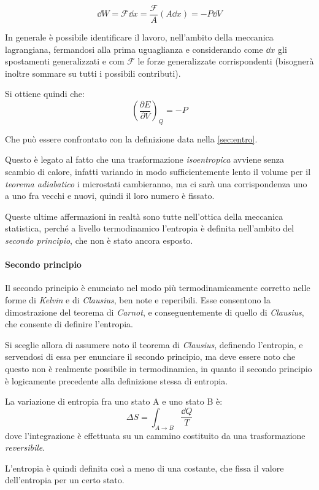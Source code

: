 \begin{equation*}
\dd W = \mathcal{F} \dd x = \frac{\mathcal{F}}{A} (A\dd x) = - P \dd V
\end{equation*}

\noindent In generale è possibile identificare il lavoro, nell'ambito della meccanica lagrangiana, fermandosi alla prima uguaglianza e considerando come $\dd x$ gli spostamenti generalizzati e com $ \mathcal{F} $ le forze generalizzate corrispondenti (bisognerà inoltre sommare su tutti i possibili contributi).
\newline

Si ottiene quindi che:
\begin{equation*}
	\left(\frac{\partial E}{\partial V}\right)_Q = - P
\end{equation*}

\noindent Che può essere confrontato con la definizione data nella \cref{sec:entro}.

Questo è legato al fatto che una trasformazione \textit{isoentropica} avviene senza scambio di calore, infatti variando in modo sufficientemente lento il volume per il \textit{teorema adiabatico} i microstati cambieranno, ma ci sarà una corrispondenza uno a uno fra vecchi e nuovi, quindi il loro numero è fissato.

Queste ultime affermazioni in realtà sono tutte nell'ottica della meccanica statistica, perché a livello termodinamico l'entropia è definita nell'ambito del \textit{secondo principio}, che non è stato ancora esposto.

\paragraph{Secondo principio} Il secondo principio è enunciato nel modo più termodinamicamente corretto nelle forme di \textit{Kelvin} e di \textit{Clausius}, ben note e reperibili. Esse consentono la dimostrazione del teorema di \textit{Carnot}, e conseguentemente di quello di \textit{Clausius}, che consente di definire l'entropia.

Si sceglie allora di assumere noto il teorema di \textit{Clausius}, definendo l'entropia, e servendosi di essa per enunciare il secondo principio, ma deve essere noto che questo non è realmente possibile in termodinamica, in quanto il secondo principio è logicamente precedente alla definizione stessa di entropia.

\begin{defn}[Entropia]
	La variazione di entropia fra uno stato A e uno stato B è:
	\begin{equation*}
	\Delta S = \int_{A \rightarrow B} \frac{\dd Q}{T}
	\end{equation*}
	dove l'integrazione è effettuata su un cammino costituito da una trasformazione \textit{reversibile}.
	
	L'entropia è quindi definita così a meno di una costante, che fissa il valore dell'entropia per un certo stato.
\end{defn}

